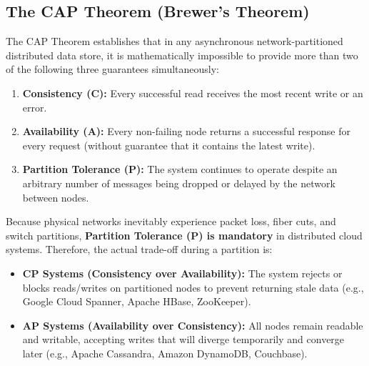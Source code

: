 \subsection{The CAP Theorem (Brewer's Theorem)}
The CAP Theorem establishes that in any asynchronous network-partitioned distributed data store, it is mathematically impossible to provide more than two of the following three guarantees simultaneously:
\begin{enumerate}
    \item \textbf{Consistency (C):} Every successful read receives the most recent write or an error.
    \item \textbf{Availability (A):} Every non-failing node returns a successful response for every request (without guarantee that it contains the latest write).
    \item \textbf{Partition Tolerance (P):} The system continues to operate despite an arbitrary number of messages being dropped or delayed by the network between nodes.
\end{enumerate}
\begin{tcolorbox}[colback=blue!5!white,colframe=blue!75!black,title=\textbf{The Real-World CAP Trade-Off}]
Because physical networks inevitably experience packet loss, fiber cuts, and switch partitions, \textbf{Partition Tolerance (P) is mandatory} in distributed cloud systems. Therefore, the actual trade-off during a partition is:
\begin{itemize}
    \item \textbf{CP Systems (Consistency over Availability):} The system rejects or blocks reads/writes on partitioned nodes to prevent returning stale data (e.g., Google Cloud Spanner, Apache HBase, ZooKeeper).
    \item \textbf{AP Systems (Availability over Consistency):} All nodes remain readable and writable, accepting writes that will diverge temporarily and converge later (e.g., Apache Cassandra, Amazon DynamoDB, Couchbase).
\end{itemize}
\end{tcolorbox}

